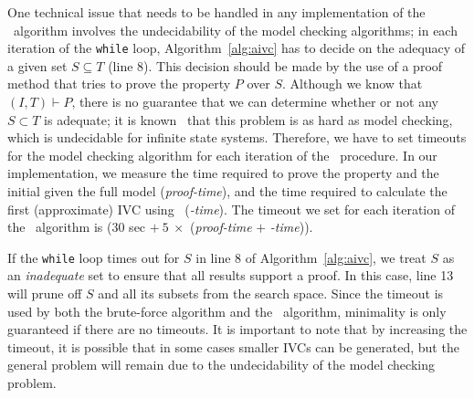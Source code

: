 One technical issue that needs to
be handled in any implementation of the \aivcalg ~algorithm involves the undecidability of the model checking algorithms;
in each iteration of the \texttt{while} loop, Algorithm~\ref{alg:aivc}
has to decide on the adequacy of a given set $S \subseteq T$ (line 8).
This decision should be made by the use of a proof method that
tries to prove the property $P$ over $S$. Although we know that $(I, T) \vdash P$,
there is no guarantee that we can determine whether or not any $S \subset T$ is adequate; it is known~\cite{Ghass16} that
this problem is as hard as model checking, which is undecidable for infinite state systems.  
%
Therefore, we have to set timeouts for the model checking algorithm for each iteration of the \aivcalg\ procedure.
In our implementation, we measure the time required to prove the property and the initial 
given the full model (\emph{proof-time}), and the time required to calculate the first 
(approximate) IVC using \ucalg\ (\emph{\ucalg-time}).
The timeout we set for each iteration of the \aivcalg\ algorithm is ($30$ sec  $+\ 5\ \times$ (\emph{proof-time} $+$ \emph{\ucalg-time})).

If the \texttt{while} loop times out for $S$ in line 8 of Algorithm~\ref{alg:aivc},
we treat $S$ as an \emph{inadequate} set to ensure that all results support a proof.
In this case, line 13 will prune off $S$ and all 
its subsets from the search space.  Since the timeout is used by both the brute-force 
algorithm and the \aivcalg\ algorithm, minimality is only guaranteed if there 
are no timeouts.  %
It is important to note that by increasing the timeout, it is possible that 
in some cases smaller IVCs can be generated, but the general problem will remain due
to the undecidability of the model checking problem.




%

